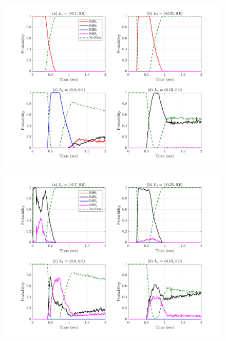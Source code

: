 \documentclass{article}
\begin{document}
\begin{figure}[H]
        \centering
        \includegraphics[width=1\textwidth]{InclinedPlane/Dominance1/DominanceCX.png}
        \caption{}
        \label{fig:Ramp-FDominance1-CX}
\end{figure}

\begin{figure}[H]
        \centering
        \includegraphics[width=1\textwidth]{InclinedPlane/Dominance1/DominanceCY.png}
        \caption{}
        \label{fig:Ramp-FDominance1-CY}
\end{figure}
\end{document}
